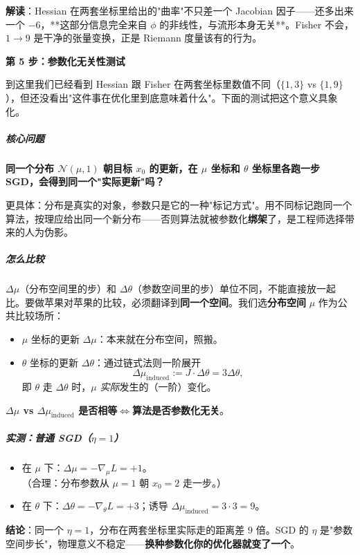 \documentclass[11pt,a4paper]{article}
\theoremstyle{mythm}
\theoremstyle{mydef}
\begin{document}
\textbf{解读}：Hessian 在两套坐标里给出的"曲率"不只差一个 Jacobian 因子——还多出来一个 $-6$，**这部分信息完全来自 $\phi$ 的非线性，与流形本身无关**。Fisher 不会，$1\to 9$ 是干净的张量变换，正是 Riemann 度量该有的行为。

\textbf{第 5 步：参数化无关性测试}

到这里我们已经看到 Hessian 跟 Fisher 在两套坐标里数值不同（$\{1,3\}$ vs $\{1, 9\}$），但还没看出"这件事在优化里到底意味着什么"。下面的测试把这个意义具象化。

\subparagraph{核心问题}
\textbf{同一个分布 $\mathcal{N}(\mu, 1)$ 朝目标 $x_0$ 的更新，在 $\mu$ 坐标和 $\theta$ 坐标里各跑一步 SGD，会得到同一个"实际更新"吗？}

更具体：分布是真实的对象，参数只是它的一种"标记方式"。用不同标记跑同一个算法，按理应给出同一个新分布——否则算法就被参数化\textbf{绑架}了，是工程师选择带来的人为伪影。

\subparagraph{怎么比较}
$\Delta\mu$（分布空间里的步）和 $\Delta\theta$（参数空间里的步）单位不同，不能直接放一起比。要做苹果对苹果的比较，必须翻译到\textbf{同一个空间}。我们选\textbf{分布空间} $\mu$ 作为公共比较场所：
\begin{itemize}[leftmargin=2em]
\item $\mu$ 坐标的更新 $\Delta\mu$：本来就在分布空间，照搬。
\item $\theta$ 坐标的更新 $\Delta\theta$：通过链式法则一阶展开
$$\Delta\mu_{\text{induced}} := J\cdot\Delta\theta = 3\Delta\theta,$$
即 $\theta$ 走 $\Delta\theta$ 时，$\mu$ \emph{实际}发生的（一阶）变化。
\end{itemize}

\textbf{$\Delta\mu$ vs $\Delta\mu_{\text{induced}}$ 是否相等}\;$\Longleftrightarrow$\;\textbf{算法是否参数化无关}。

\subparagraph{实测：普通 SGD（$\eta=1$）}
\begin{itemize}[leftmargin=2em]
\item 在 $\mu$ 下：$\Delta\mu = -\nabla_\mu L = +1$。\\
\quad（合理：分布参数从 $\mu = 1$ 朝 $x_0 = 2$ 走一步。）
\item 在 $\theta$ 下：$\Delta\theta = -\nabla_\theta L = +3$；诱导
$\Delta\mu_{\text{induced}} = 3\cdot 3 = 9$。
\end{itemize}
\begin{center}
\end{center}
\textbf{结论}：同一个 $\eta = 1$，分布在两套坐标里实际走的距离差 $9$ 倍。SGD 的 $\eta$ 是"参数空间步长"，物理意义不稳定——\textbf{换种参数化你的优化器就变了一个}。
\end{document}
